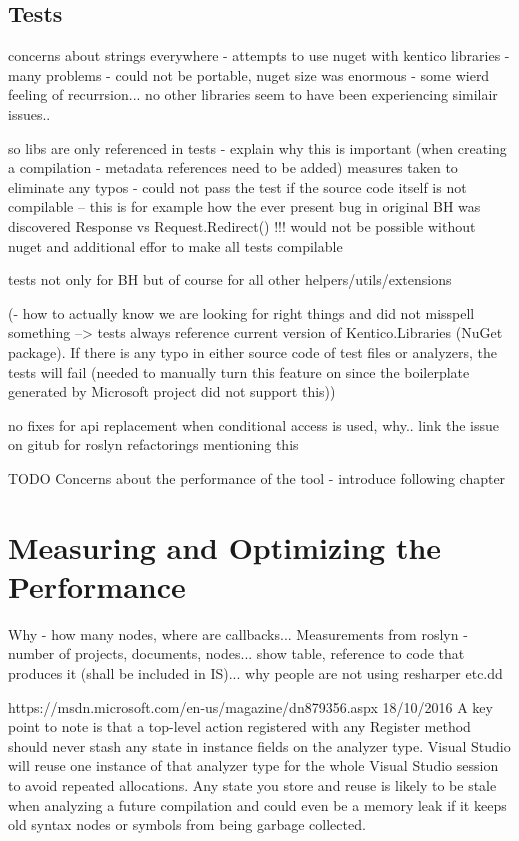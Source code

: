 \documentclass[
  digital, %
  table,   %
  lof,     %
  lot,     %
  oneside,
]{fithesis3}
\begin{document}
\section{Tests}
concerns about strings everywhere - attempts to use nuget with kentico libraries - many problems - could not be portable, nuget size was enormous - some wierd feeling of recurrsion... no other libraries seem to have been experiencing similair issues..

so libs are only referenced in tests - explain why this is important (when creating a compilation - metadata references need to be added)
measures taken to eliminate any typos - could not pass the test if the source code itself is not compilable -- this is for example how the ever present bug in original BH was discovered Response vs Request.Redirect() !!! would not be possible without nuget and additional effor to make all tests compilable

tests not only for BH but of course for all other helpers/utils/extensions

(- how to actually know we are looking for right things and did not misspell something --> tests always reference current version of Kentico.Libraries (NuGet package). If there is any typo in either source code of test files or analyzers, the tests will fail (needed to manually turn this feature on since the boilerplate generated by Microsoft project did not support this))

no fixes for api replacement when conditional access is used, why.. link the issue on gitub for roslyn refactorings mentioning this


TODO
Concerns about the performance of the tool - introduce following chapter

\chapter{Measuring and Optimizing the Performance}
Why - how many nodes, where are callbacks...
Measurements from roslyn - number of projects, documents, nodes... show table, reference to code that produces it (shall be included in IS)... why people are not using resharper etc.dd

https://msdn.microsoft.com/en-us/magazine/dn879356.aspx 18/10/2016
A key point to note is that a top-level action registered with any Register method should never stash any state in instance fields on the analyzer type. Visual Studio will reuse one instance of that analyzer type for the whole Visual Studio session to avoid repeated allocations. Any state you store and reuse is likely to be stale when analyzing a future compilation and could even be a memory leak if it keeps old syntax nodes or symbols from being garbage collected.
\end{document}
